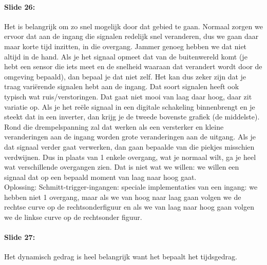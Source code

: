 \documentclass[10pt,a4paper]{book}
\begin{document}
\paragraph{Slide 26:} Het is belangrijk om zo snel mogelijk door dat gebied te gaan. Normaal zorgen we ervoor dat aan de ingang die signalen redelijk snel veranderen, dus we gaan daar maar korte tijd inzitten, in die overgang. Jammer genoeg hebben we dat niet altijd in de hand. Als je het signaal opmeet dat van de buitenwereld komt (je hebt een sensor die iets meet en de snelheid waaraan dat verandert wordt door de omgeving bepaald), dan bepaal je dat niet zelf. Het kan dus zeker zijn dat je traag vari\"erende signalen hebt aan de ingang. Dat soort signalen heeft ook typisch wat ruis/verstoringen. Dat gaat niet mooi van laag daar hoog, daar zit variatie op. Als je het re\"ele signaal in een digitale schakeling binnenbrengt en je steekt dat in een inverter, dan krijg je de tweede bovenste grafiek (de middelste). Rond die drempelspanning zal dat werken als een versterker en kleine veranderingen aan de ingang worden grote veranderingen aan de uitgang. Als je dat signaal verder gaat verwerken, dan gaan bepaalde van die piekjes misschien verdwijnen. Dus in plaats van 1 enkele overgang, wat je normaal wilt, ga je heel wat verschillende overgangen zien. Dat is niet wat we willen: we willen een signaal dat op een bepaald moment van laag naar hoog gaat. \\
Oplossing: Schmitt-trigger-ingangen: speciale implementaties van een ingang: we hebben niet 1 overgang, maar als we van hoog naar laag gaan volgen we de rechtse curve op de rechtsonderfiguur en als we van laag naar hoog gaan volgen we de linkse curve op de rechtsonder figuur.

\paragraph{Slide 27:} Het dynamisch gedrag is heel belangrijk want het bepaalt het tijdsgedrag.
\end{document}
